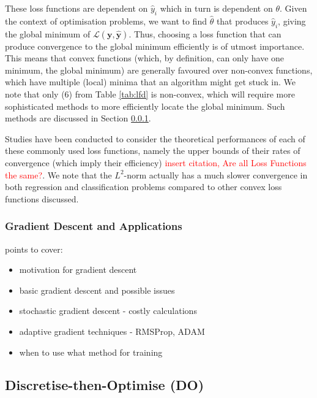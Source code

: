\documentclass[a4paper,11pt,titlepage]{article}
\theoremstyle{definition}
\theoremstyle{plain}
\theoremstyle{remark}
\begin{document}
These loss functions are dependent on $\hat{y}_i$ which in turn is dependent on $\theta$. Given the context of optimisation problems, we want to find $\hat{\theta}$ that produces $\hat{y}_i$, giving the global minimum of $\mathcal{L}(\mathbf{y}, \mathbf{\hat{y}})$. Thus, choosing a loss function that can produce convergence to the global minimum efficiently is of utmost importance. This means that convex functions (which, by definition, can only have one minimum, the global minimum) are generally favoured over non-convex functions, which have multiple (local) minima that an algorithm might get stuck in. We note that only (6) from Table \ref{tab:lfd} is non-convex, which will require more sophisticated methods to more efficiently locate the global minimum. Such methods are discussed in Section \ref{sec:gd}.

Studies have been conducted to consider the theoretical performances of each of these commonly used loss functions, namely the upper bounds of their rates of convergence (which imply their efficiency) \textcolor{red}{insert citation, Are all Loss Functions the same?}. We note that the $L^2$-norm actually has a much slower convergence in both regression and classification problems compared to other convex loss functions discussed.

\subsubsection{Gradient Descent and Applications}
\label{sec:gd}

points to cover:
\begin{itemize}
    \item motivation for gradient descent
    \item basic gradient descent and possible issues
    \item stochastic gradient descent - costly calculations
    \item adaptive gradient techniques - RMSProp, ADAM
    \item when to use what method for training
\end{itemize}

\subsection{Discretise-then-Optimise (DO)}
\label{sec:do}
\end{document}
